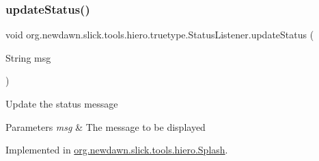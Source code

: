 \subsubsection{\texorpdfstring{update\+Status()}{updateStatus()}}
{\footnotesize\ttfamily void org.\+newdawn.\+slick.\+tools.\+hiero.\+truetype.\+Status\+Listener.\+update\+Status (\begin{DoxyParamCaption}\item[{String}]{msg }\end{DoxyParamCaption})}

Update the status message


\begin{DoxyParams}{Parameters}
{\em msg} & The message to be displayed \\
\hline
\end{DoxyParams}


Implemented in \mbox{\hyperlink{classorg_1_1newdawn_1_1slick_1_1tools_1_1hiero_1_1_splash_a467907efe0d4c6dabd2b1f60ecefd660}{org.\+newdawn.\+slick.\+tools.\+hiero.\+Splash}}.

